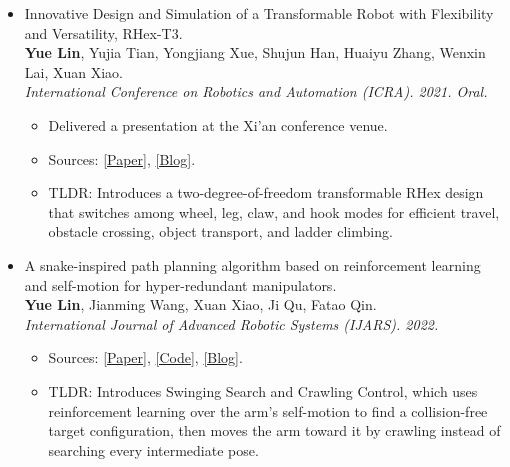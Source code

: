 \documentclass[a4paper,20pt]{article}
\newcommand{\resumeItem}[2]{
  \item\small{
    \textbf{#1}{#2}
  }
}
\newcommand{\resumeSubItem}[2]{\resumeItem{#1}{#2}\vspace{-3pt}}
\newcommand{\resumeSubHeadingListStart}{\begin{itemize}[leftmargin=*]}
\newcommand{\resumeSubHeadingListEnd}{\end{itemize}}
\begin{document}
\begin{itemize}[leftmargin=*,itemsep=0pt,topsep=0pt,partopsep=0pt]
\begin{itemize}[itemsep=0pt,topsep=0pt,partopsep=0pt]
      \end{itemize}
\item Innovative Design and Simulation of a Transformable Robot with Flexibility and Versatility, RHex-T3. \\
      \textbf{Yue Lin}, Yujia Tian, Yongjiang Xue, Shujun Han, Huaiyu Zhang, Wenxin Lai, Xuan Xiao. \\
      \textit{International Conference on Robotics and Automation (ICRA). 2021. Oral.}
      \begin{itemize}[itemsep=0pt,topsep=0pt,partopsep=0pt]
        \item Delivered a presentation at the Xi’an conference venue.
        \item Sources:
            \href{https://ieeexplore.ieee.org/abstract/document/9561060}{[Paper]},
            \href{https://yuelin301.github.io/posts/RHex-T3/}{[Blog]}.
        \item TLDR: Introduces a two-degree-of-freedom transformable RHex design that switches among wheel, leg, claw, and hook modes for efficient travel, obstacle crossing, object transport, and ladder climbing.
      \end{itemize}
\item A snake-inspired path planning algorithm based on reinforcement learning and self-motion for hyper-redundant manipulators. \\
      \textbf{Yue Lin}, Jianming Wang, Xuan Xiao, Ji Qu, Fatao Qin. \\
      \textit{International Journal of Advanced Robotic Systems (IJARS). 2022.}
      \begin{itemize}[itemsep=0pt,topsep=0pt,partopsep=0pt]
          \item Sources:
                \href{https://journals.sagepub.com/doi/full/10.1177/17298806221110022}{[Paper]},
                \href{https://github.com/YueLin301/Swinging-Search-Crawling-Control}{[Code]},
                \href{https://yuelin301.github.io/posts/SSCC/}{[Blog]}.
            \item TLDR: Introduces Swinging Search and Crawling Control, which uses reinforcement learning over the arm's self-motion to find a collision-free target configuration, then moves the arm toward it by crawling instead of searching every intermediate pose.
      \end{itemize}

\end{itemize}
\end{document}
